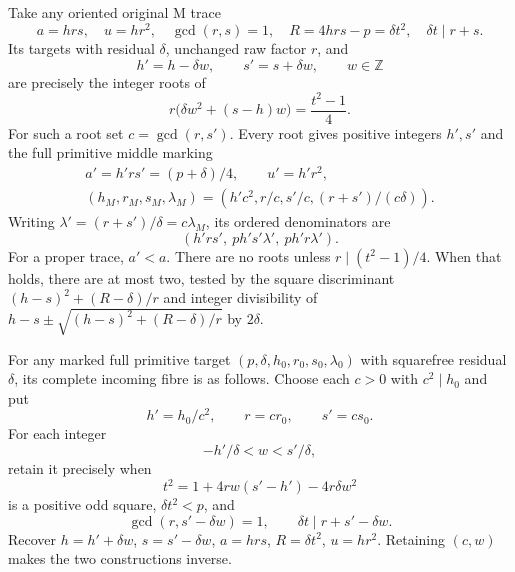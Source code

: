\begin{theorem}\label{thm:sumshift}
Take any oriented original M trace
\[
 a=hrs,\quad u=hr^2,\quad \gcd(r,s)=1,\quad
 R=4hrs-p=\delta t^2,\quad \delta t\mid r+s.
\]
Its targets with residual $\delta$, unchanged raw factor $r$, and
\[
 h'=h-\delta w,\qquad s'=s+\delta w,\qquad w\in\mathbb Z
\]
are precisely the integer roots of
\begin{equation}\label{eq:quad}
 r\bigl(\delta w^2+(s-h)w\bigr)=\frac{t^2-1}{4}.
\end{equation}
For such a root set $c=\gcd(r,s')$. Every root gives positive integers $h',s'$
and the full primitive middle marking
\begin{equation}\label{eq:shiftout}
 \begin{gathered}
 a'=h'rs'=(p+\delta)/4,\qquad u'=h'r^2,\\
 (h_M,r_M,s_M,\lambda_M)
 =\left(h'c^2,r/c,s'/c,(r+s')/(c\delta)\right).
 \end{gathered}
\end{equation}
Writing $\lambda'=(r+s')/\delta=c\lambda_M$, its ordered denominators are
\begin{equation}\label{eq:shiftden}
 (h'rs',\ ph's'\lambda',\ ph'r\lambda').
\end{equation}
For a proper trace, $a'<a$.
There are no roots unless $r\mid(t^2-1)/4$. When that holds, there are at most
two, tested by the square discriminant $(h-s)^2+(R-\delta)/r$ and integer
divisibility of $h-s\pm\sqrt{(h-s)^2+(R-\delta)/r}$ by $2\delta$.

For any marked full primitive target $(p,\delta,h_0,r_0,s_0,\lambda_0)$ with
squarefree residual $\delta$, its complete incoming fibre is as follows.
Choose each $c>0$ with $c^2\mid h_0$ and put
\[
 h'=h_0/c^2,\qquad r=cr_0,\qquad s'=cs_0.
\]
For each integer
\begin{equation}\label{eq:inverse-w}
 -h'/\delta<w<s'/\delta,
\end{equation}
retain it precisely when
\[
 t^2=1+4r w(s'-h')-4r\delta w^2
\]
is a positive odd square, $\delta t^2<p$, and
\[
 \gcd(r,s'-\delta w)=1,\qquad
 \delta t\mid r+s'-\delta w.
\]
Recover $h=h'+\delta w$, $s=s'-\delta w$, $a=hrs$, $R=\delta t^2$, $u=hr^2$.
Retaining $(c,w)$ makes the two constructions inverse.
\end{theorem}

